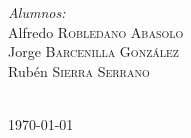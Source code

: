 \documentclass{article}
\begin{document}
\begin{titlepage}
\begin{minipage}{0.5\textwidth}
    \begin{flushleft} \large
        \emph{Alumnos:}\\
            Alfredo \textsc{Robledano Abasolo}\\ 
            Jorge \textsc{Barcenilla González}\\ 
            Rubén \textsc{Sierra Serrano}\\
    \end{flushleft}
\end{minipage}\\[0.8cm]



{\large \today}\\[2cm]
\vfill 

\end{titlepage}

\pagebreak



\pagebreak

\tableofcontents

\pagebreak



\pagebreak


\end{document}
